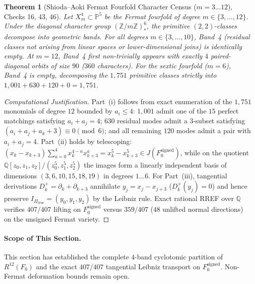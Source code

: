 \documentclass[11pt,a4paper]{amsart}
\newtheorem{theorem}{Theorem}[section]
\theoremstyle{definition}
\theoremstyle{remark}
\begin{document}
\begin{theorem}[Shioda--Aoki Fermat Fourfold Character Census ($m=3\dots 12$), Checks 16, 43, 46]
\label{thm:shioda_aoki_census}
Let $X_m^4 \subset \mathbb{P}^5$ be the Fermat fourfold of degree $m \in \{3, \dots, 12\}$. Under the diagonal character group $(\mathbb{Z}/m\mathbb{Z})_*^6$, the primitive $(2,2)$-classes decompose into geometric bands. For all degrees $m \in \{3, \dots, 10\}$, Band~4 (residual classes not arising from linear spaces or lower-dimensional joins) is identically empty. At $m=12$, Band~4 first non-trivially appears with exactly $4$ paired-diagonal orbits of size $90$ ($360$ characters). For the sextic fourfold ($m=6$), Band~4 is empty, decomposing the $1,751$ primitive classes strictly into $1,001 + 630 + 120 + 0 = 1,751$.
\end{theorem}

\begin{proof}[Computational Justification]
Part~(i) follows from exact enumeration of the $1,751$ monomials of degree $12$ bounded by $a_i \le 4$: $1,001$ admit one of the $15$ perfect matchings satisfying $a_i+a_j = 4$; $630$ residual modes admit a $3$-subset satisfying $(a_i+a_j+a_k+3) \equiv 0 \pmod 6$; and all remaining $120$ modes admit a pair with $a_i+a_j = 4$. Part~(ii) holds by telescoping: $(x_k - x_{k+3})\sum_{a=0}^4 x_k^{4-a}x_{k+3}^a = x_k^5 - x_{k+3}^5 \in J(F_0^{\mathrm{signed}})$, while on the quotient $\mathbb{Q}[z_0,z_1,z_2]/(z_0^5,z_1^5,z_2^5)$ the images form a linearly independent basis of dimensions $(3,6,10,15,18,19)$ in degrees $1 \dots 6$. For Part~(iii), tangential derivations $D_k^+ = \partial_k + \partial_{k+3}$ annihilate $y_j = x_j - x_{j+3}$ ($D_k^+(y_j) = 0$) and hence preserve $I_{\Pi_{\mathrm{true}}} = (y_0,y_1,y_2)$ by the Leibniz rule. Exact rational RREF over $\mathbb{Q}$ verifies $407/407$ lifting on $F_0^{\mathrm{signed}}$ versus $359/407$ ($48$ unlifted normal directions) on the unsigned Fermat variety.
\end{proof}

\paragraph{Scope of This Section.}
This section has established the complete $4$-band cyclotomic partition of $R^{12}(F_0)$ and the exact $407/407$ tangential Leibniz transport on $F_0^{\mathrm{signed}}$. Non-Fermat deformation bounds remain open.

\end{document}
